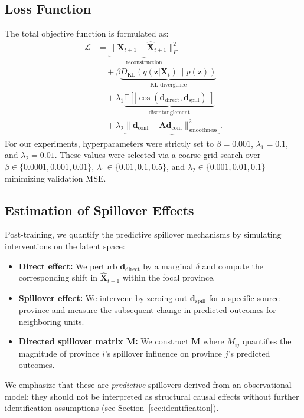 \documentclass[conference]{IEEEtran}
\begin{document}
\subsection{Loss Function}
The total objective function is formulated as:
\begin{align*}
\mathcal{L} &= \underbrace{\|\mathbf{X}_{t+1} - \hat{\mathbf{X}}_{t+1}\|_F^2}_{\text{reconstruction}} \\
            &\quad + \beta \underbrace{ D_{\text{KL}}(q(\mathbf{z}|\mathbf{X}_t)\|p(\mathbf{z})) }_{\text{KL divergence}} \\
            &\quad + \lambda_1 \underbrace{ \mathbb{E}[|\cos(\mathbf{d}_{\text{direct}},\mathbf{d}_{\text{spill}})|] }_{\text{disentanglement}} \\
            &\quad + \lambda_2 \underbrace{ \|\mathbf{d}_{\text{conf}} - \mathbf{A}\mathbf{d}_{\text{conf}}\|^2_{\text{smoothness}} }.
\end{align*}
For our experiments, hyperparameters were strictly set to $\beta=0.001$, $\lambda_1=0.1$, and $\lambda_2=0.01$. These values were selected via a coarse grid search over $\beta \in \{0.0001, 0.001, 0.01\}$, $\lambda_1 \in \{0.01, 0.1, 0.5\}$, and $\lambda_2 \in \{0.001, 0.01, 0.1\}$ minimizing validation MSE.

\subsection{Estimation of Spillover Effects}
Post-training, we quantify the predictive spillover mechanisms by simulating interventions on the latent space:
\begin{itemize}
\item \textbf{Direct effect:} We perturb $\mathbf{d}_{\text{direct}}$ by a marginal $\delta$ and compute the corresponding shift in $\hat{\mathbf{X}}_{t+1}$ within the focal province.
\item \textbf{Spillover effect:} We intervene by zeroing out $\mathbf{d}_{\text{spill}}$ for a specific source province and measure the subsequent change in predicted outcomes for neighboring units.
\item \textbf{Directed spillover matrix $\mathbf{M}$:} We construct $\mathbf{M}$ where $M_{ij}$ quantifies the magnitude of province $i$'s spillover influence on province $j$'s predicted outcomes.
\end{itemize}
We emphasize that these are \textit{predictive} spillovers derived from an observational model; they should not be interpreted as structural causal effects without further identification assumptions (see Section~\ref{sec:identification}).
\end{document}
